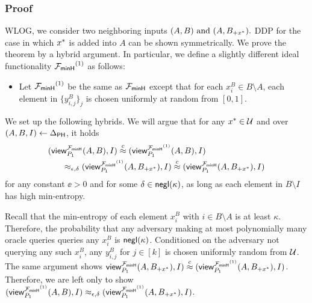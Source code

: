 

 \subsubsection{Proof}
\label{apx:pubHashHighEntropy}
WLOG, we consider two neighboring inputs 
$(A, B) \mbox{ and } (A, B_{+x^*}).$
DDP for the case in which ${x^*}$ is added into $A$ can be shown symmetrically. We
prove the theorem by a hybrid argument. In particular, we define a slightly
different ideal functionality ${\mathcal{F}_\mathsf{minH}}^{(1)}$ as follows:
%
\begin{itemize}
\item Let ${\mathcal{F}_\mathsf{minH}}^{(1)}$ be the same as ${\mathcal{F}_\mathsf{minH}}$ except that for each $x^B_i
\in B\setminus A$, each element in $\{y^B_{i,j}\}_j$ is chosen uniformly
at random from $[0,1]$.
\end{itemize}


We set up the following
hybrids.  We will argue that for any ${x^*} \in \mathcal{U}$ and over $(A, B, I)
\leftarrow \Delta_{\mathsf{PH}}$, it holds 
%
\begin{align*}
& (\mathsf{view}^{{\mathcal{F}_\mathsf{minH}}}_{P_1}(A,B), I) \stackrel{c}{\approx}
(\mathsf{view}^{{\mathcal{F}_\mathsf{minH}}^{(1)}}_{P_1}(A,B), I) \\
& ~~~~~ \approx_{\epsilon, \delta} (\mathsf{view}^{{\mathcal{F}_\mathsf{minH}}^{(1)}}_{P_1}(A, B_{+x^*}), I)
\stackrel{c}{\approx} (\mathsf{view}^{{\mathcal{F}_\mathsf{minH}}}_{P_1}(A, B_{+x^*}), I)
\end{align*}
%
for any constant $\ee > 0$ and for some $\delta \in \mathsf{negl}(\kappa)$, as
long as each element in $B \setminus I$ has high min-entropy.  

Recall that the min-entropy of
each element $x^B_i$ with $i \in B\setminus A$ is at least $\kappa$.
Therefore, the probability that any adversary making at most
polynomially many oracle queries queries any $x^B_i$ is $\mathsf{negl}(\kappa)$.
Conditioned on the adversary not querying any such $x^B_i$, any
$y^B_{i,j}$ for $j \in [k]$ is chosen uniformly random from $\mathcal{U}$.
%
The same argument shows $\mathsf{view}^{{\mathcal{F}_\mathsf{minH}}}_{P_1}(A,B_{+x^*}), I) \stackrel{c}{\approx}
(\mathsf{view}^{{\mathcal{F}_\mathsf{minH}}^{(1)}}_{P_1}(A,B_{+x^*}), I)$.
Therefore, we are left only to show
$(\mathsf{view}^{{\mathcal{F}_\mathsf{minH}}^{(1)}}_{P_1}(A,B), I)  \approx_{\epsilon,\delta}  (\mathsf{view}^{{\mathcal{F}_\mathsf{minH}}^{(1)}}_{P_1}(A,
B_{+x^*}), I)$.




